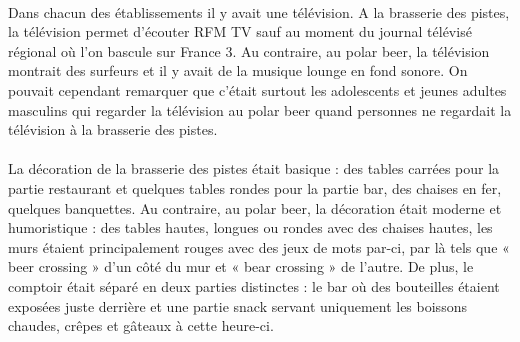 \paragraph{}
Dans chacun des établissements il y avait une télévision. A la brasserie des
pistes, la télévision permet d’écouter RFM TV sauf au moment du journal
télévisé régional où l’on bascule sur France 3. Au contraire, au polar beer, la
télévision montrait des surfeurs et il y avait de la musique lounge en fond
sonore. On pouvait cependant remarquer que c’était surtout les adolescents et
jeunes adultes masculins qui regarder la télévision au polar beer quand
personnes ne regardait la télévision à la brasserie des pistes.

\paragraph{}
La décoration de la brasserie des pistes était basique : des tables carrées
pour la partie restaurant et quelques tables rondes pour la partie bar, des
chaises en fer, quelques banquettes. Au contraire, au polar beer, la décoration
était moderne et humoristique : des tables hautes, longues ou rondes avec des
chaises hautes, les murs étaient principalement rouges avec des jeux de mots
par-ci, par là tels que « beer crossing » d’un côté du mur et « bear crossing »
de l’autre. De plus, le comptoir était séparé en deux parties distinctes : le
bar où des bouteilles étaient exposées juste derrière et une partie snack
servant uniquement les boissons chaudes, crêpes et gâteaux à cette heure-ci.


